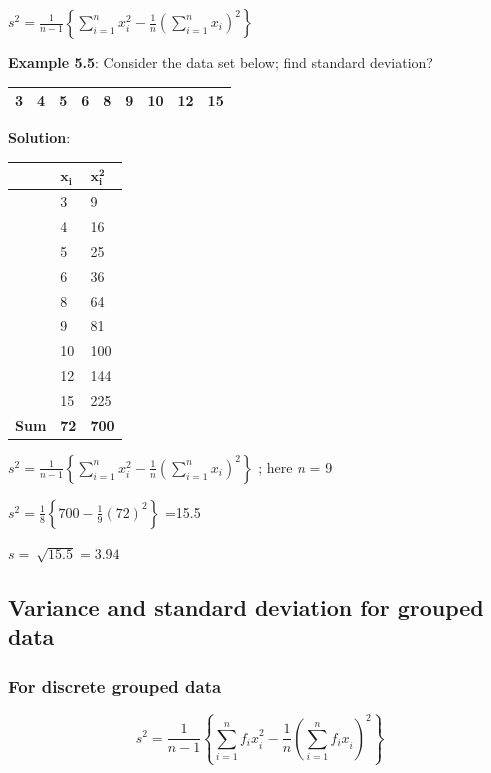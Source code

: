 \documentclass[
]{book}
\begin{document}
\(s^{2} = \frac{1}{n - 1}\left\{ \sum_{i = 1}^{n}{x_{i}^{2} - \frac{1}{n}}\left( \sum_{i = 1}^{n}x_{i} \right)^{2} \right\}\)

\textbf{Example 5.5}: Consider the data set below; find standard deviation?

\begin{longtable}[]{@{}lllllllll@{}}
\toprule
\endhead
3 & 4 & 5 & 6 & 8 & 9 & 10 & 12 & 15 \\
\bottomrule
\end{longtable}

\textbf{Solution}:

\begin{longtable}[]{@{}lll@{}}
\toprule
& \(\mathbf{x}_{\mathbf{i}}\) & \(\mathbf{x}_{\mathbf{i}}^{\mathbf{2}}\) \\
\midrule
\endhead
& 3 & 9 \\
& 4 & 16 \\
& 5 & 25 \\
& 6 & 36 \\
& 8 & 64 \\
& 9 & 81 \\
& 10 & 100 \\
& 12 & 144 \\
& 15 & 225 \\
\textbf{Sum} & \textbf{72} & \textbf{700} \\
\bottomrule
\end{longtable}

\(s^{2} = \frac{1}{n - 1}\left\{ \sum_{i = 1}^{n}{x_{i}^{2} - \frac{1}{n}}\left( \sum_{i = 1}^{n}x_{i} \right)^{2} \right\}\)
; here \emph{n} = 9

\(s^{2} = \frac{1}{8}\left\{ 700 - {\frac{1}{9}\left( 72 \right)}^{2} \right\}\)
=15.5

\(s = \ \sqrt{15.5} = 3.94\)

\hypertarget{variance-and-standard-deviation-for-grouped-data}{%
\subsection{Variance and standard deviation for grouped data}\label{variance-and-standard-deviation-for-grouped-data}}

\hypertarget{for-discrete-grouped-data}{%
\subsubsection{For discrete grouped data}\label{for-discrete-grouped-data}}

\[s^{2} = \frac{1}{n - 1}\left\{ \sum_{i = 1}^{n}{{f_{i}x}_{i}^{2} - \frac{1}{n}}\left( \sum_{i = 1}^{n}{f_{i}x}_{i} \right)^{2} \right\}\]
\end{document}
